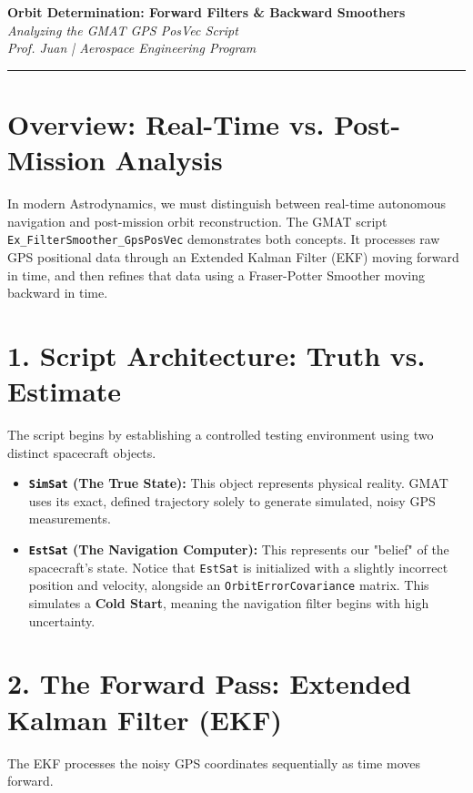 \documentclass[11pt, letterpaper]{article}
\begin{document}
\begin{center}
    {\Large \textbf{Orbit Determination: Forward Filters \& Backward Smoothers}} \\
    \vspace{0.2cm}
    {\large \textit{Analyzing the GMAT GPS PosVec Script}} \\
    \vspace{0.4cm}
    \textit{Prof. Juan | Aerospace Engineering Program}
\end{center}
\hrule
\vspace{0.5cm}

\section*{Overview: Real-Time vs. Post-Mission Analysis}
In modern Astrodynamics, we must distinguish between real-time autonomous navigation and post-mission orbit reconstruction. The GMAT script \texttt{Ex\_FilterSmoother\_GpsPosVec} demonstrates both concepts. It processes raw GPS positional data through an Extended Kalman Filter (EKF) moving forward in time, and then refines that data using a Fraser-Potter Smoother moving backward in time.

\section*{1. Script Architecture: Truth vs. Estimate}
The script begins by establishing a controlled testing environment using two distinct spacecraft objects.

\begin{itemize}
    \item \textbf{\texttt{SimSat} (The True State):} This object represents physical reality. GMAT uses its exact, defined trajectory solely to generate simulated, noisy GPS measurements.
    \item \textbf{\texttt{EstSat} (The Navigation Computer):} This represents our "belief" of the spacecraft's state. Notice that \texttt{EstSat} is initialized with a slightly incorrect position and velocity, alongside an \texttt{OrbitErrorCovariance} matrix. This simulates a \textbf{Cold Start}, meaning the navigation filter begins with high uncertainty.
\end{itemize}

\section*{2. The Forward Pass: Extended Kalman Filter (EKF)}
The EKF processes the noisy GPS coordinates sequentially as time moves forward. 
\end{document}
